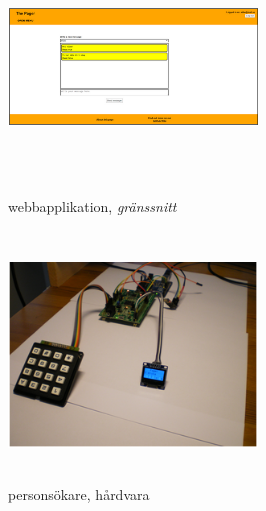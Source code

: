 \documentclass[conference]{IEEEtran}
\begin{document}
\begin{figure}[h!]
    \centerline{\includegraphics[max height=250px, max width=250px]{images/webbapplikation.png}}
    \caption{webbapplikation, \textit{gränssnitt}}
    \label{fig:webbapp}
\end{figure}

\begin{figure}[h!tbp]
    \centerline{\includegraphics[max height=250px, max width=250px]{images/personsokare.png}}
    \caption{personsökare, hårdvara}
    \label{fig:personsokare}
\end{figure}

\end{document}
